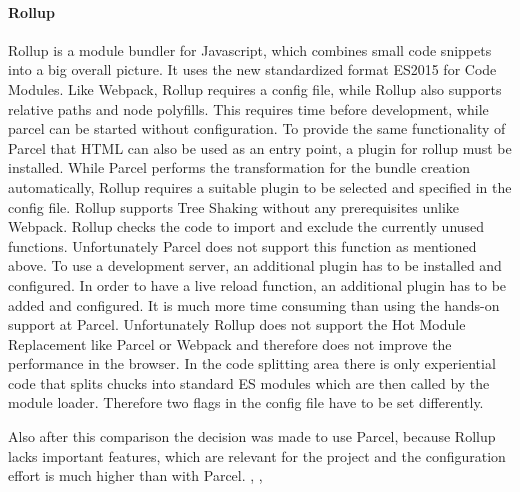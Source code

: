 \paragraph{Rollup}
\label{par:tecRollup}
Rollup is a module bundler for Javascript, which combines small code snippets into a big overall picture. It uses the new standardized format ES2015 for Code Modules. Like Webpack, Rollup requires a config file, while Rollup also supports relative paths and node polyfills. This requires time before development, while parcel can be started without configuration. To provide the same functionality of Parcel that HTML can also be used as an entry point, a plugin for rollup must be installed. While Parcel performs the transformation for the bundle creation automatically, Rollup requires a suitable plugin to be selected and specified in the config file.  Rollup supports Tree Shaking without any prerequisites unlike Webpack. Rollup checks the code to import and exclude the currently unused functions. Unfortunately Parcel does not support this function as mentioned above. To use a development server, an additional plugin has to be installed and configured. In order to have a live reload function, an additional plugin has to be added and configured. It is much more time consuming than using the hands-on support at Parcel. Unfortunately Rollup does not support the Hot Module Replacement like Parcel or Webpack and therefore does not improve the performance in the browser. In the code splitting area there is only experiential code that splits chucks into standard ES modules which are then called by the module loader. Therefore two flags in the config file have to be set differently.

Also after this comparison the decision was made to use Parcel, because Rollup lacks important features, which are relevant for the project and the configuration effort is much higher than with Parcel. \cite{Bhatia2018}, \cite{WebpackAuthors2019}, \cite{rollupJs-Authors2019}

